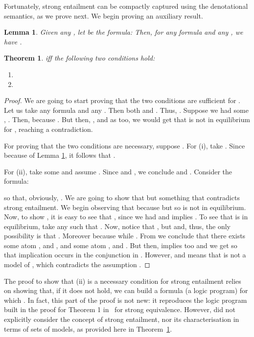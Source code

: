\documentclass{tlp}
\def\qed{~\hfill}
\newtheorem{theorem}{Theorem}
\newtheorem{lemma}{Lemma}
\begin{document}
Fortunately, strong entailment can be compactly captured using the denotational semantics, as we prove next. We begin proving an auxiliary result. 
\begin{lemma}
\label{one_aux_lemma} 
Given any , let  be the formula:  
Then, for any formula  and any , we have .\qed
\end{lemma}

\begin{theorem}\label{th:sentail}
 iff the following two conditions hold:
\begin{enumerate}
\item[(i)] 
\item[(ii)]  
\end{enumerate}
\end{theorem}
\begin{proof}
We are going to start proving that the two conditions are sufficient for . Let us take any formula  and any . Then both  and . Thus, . Suppose we had some , . Then,  because . But then, , and as  too, we would get that  is not in equilibrium for , reaching a contradiction.

For proving that the two conditions are necessary, suppose . For (i), take . Since  because of Lemma \ref{one_aux_lemma}, it follows that . 

For (ii), take some  and assume . Since  and , we conclude  and . Consider the formula:

\noindent so that, obviously, . We are going to show that  but  something that contradicts strong entailment. We begin observing that  because  but  so  is not in equilibrium. Now, to show , it is easy to see that , since we had  and  implies . To see that  is in equilibrium, take any   such that . Now, notice that , but  and, thus, the only possibility is that . Moreover  because  while . From  we conclude that there exists some atom ,  and , and some atom ,  and . But then,  implies  too and we get  so that implication  occurs in the conjunction in . However,  and  means that  is not a model of , which contradicts the assumption .
\end{proof}

The proof to show that (ii) is a necessary condition for strong entailment relies on showing that, if it does not hold, we can build a formula  (a logic program) for which . In fact, this part of the proof is not new: it reproduces the logic program built in the proof for Theorem 1 in~\cite{LPV01} for strong equivalence. However, \cite{LPV01} did not explicitly consider the concept of strong entailment, nor its characterisation in terms of sets of models, as provided here in Theorem~\ref{th:sentail}. 
\end{document}
